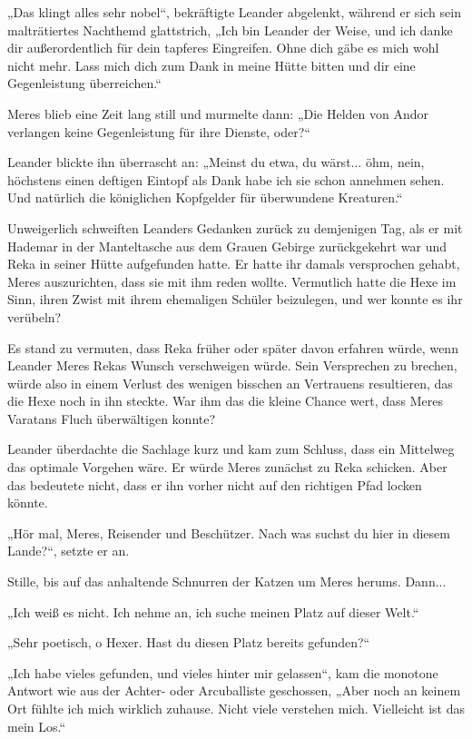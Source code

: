 \documentclass[10pt, a4paper, oneside]{book}
\begin{document}
„Das klingt alles sehr nobel“, bekräftigte Leander abgelenkt, während er sich sein malträtiertes Nachthemd glattstrich, „Ich bin Leander der Weise, und ich danke dir außerordentlich für dein tapferes Eingreifen. Ohne dich gäbe es mich wohl nicht mehr. Lass mich dich zum Dank in meine Hütte bitten und dir eine Gegenleistung überreichen.“

Meres blieb eine Zeit lang still und murmelte dann: „Die Helden von Andor verlangen keine Gegenleistung für ihre Dienste, oder?“

Leander blickte ihn überrascht an: „Meinst du etwa, du wärst... öhm, nein, höchstens einen deftigen Eintopf als Dank habe ich sie schon annehmen sehen. Und natürlich die königlichen Kopfgelder für überwundene Kreaturen.“

Unweigerlich schweiften Leanders Gedanken zurück zu demjenigen Tag, als er mit Hademar in der Manteltasche aus dem Grauen Gebirge zurückgekehrt war und Reka in seiner Hütte aufgefunden hatte. Er hatte ihr damals versprochen gehabt, Meres auszurichten, dass sie mit ihm reden wollte. Vermutlich hatte die Hexe im Sinn, ihren Zwist mit ihrem ehemaligen Schüler beizulegen, und wer konnte es ihr verübeln?

Es stand zu vermuten, dass Reka früher oder später davon erfahren würde, wenn Leander Meres Rekas Wunsch verschweigen würde. Sein Versprechen zu brechen, würde also in einem Verlust des wenigen bisschen an Vertrauens resultieren, das die Hexe noch in ihn steckte. War ihm das die kleine Chance wert, dass Meres Varatans Fluch überwältigen konnte?

Leander überdachte die Sachlage kurz und kam zum Schluss, dass ein Mittelweg das optimale Vorgehen wäre. Er würde Meres zunächst zu Reka schicken. Aber das bedeutete nicht, dass er ihn vorher nicht auf den richtigen Pfad locken könnte.

„Hör mal, Meres, Reisender und Beschützer. Nach was suchst du hier in diesem Lande?“, setzte er an.

Stille, bis auf das anhaltende Schnurren der Katzen um Meres herums. Dann...

„Ich weiß es nicht. Ich nehme an, ich suche meinen Platz auf dieser Welt.“

„Sehr poetisch, o Hexer. Hast du diesen Platz bereits gefunden?“

„Ich habe vieles gefunden, und vieles hinter mir gelassen“, kam die monotone Antwort wie aus der Achter- oder Arcuballiste geschossen, „Aber noch an keinem Ort fühlte ich mich wirklich zuhause. Nicht viele verstehen mich. Vielleicht ist das mein Los.“
\end{document}
